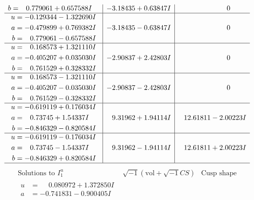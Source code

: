 \documentclass[1p]{elsarticle_modified}
\theoremstyle{definition}
\newcommand{\I}{\sqrt{-1}}
\begin{document}
$$\begin{array}{c|c|c}
\begin{aligned}
b &= \phantom{-}0.779061 + 0.657588 I\end{aligned}
 & -3.18435 + 0.63847 I & \phantom{-0.000000 } 0 \\ \hline\begin{aligned}
u &= -0.129344 - 1.322690 I \\
a &= -0.479899 + 0.769382 I \\
b &= \phantom{-}0.779061 - 0.657588 I\end{aligned}
 & -3.18435 - 0.63847 I & \phantom{-0.000000 } 0 \\ \hline\begin{aligned}
u &= \phantom{-}0.168573 + 1.321110 I \\
a &= -0.405207 + 0.035030 I \\
b &= \phantom{-}0.761529 + 0.328332 I\end{aligned}
 & -2.90837 + 2.42803 I & \phantom{-0.000000 } 0 \\ \hline\begin{aligned}
u &= \phantom{-}0.168573 - 1.321110 I \\
a &= -0.405207 - 0.035030 I \\
b &= \phantom{-}0.761529 - 0.328332 I\end{aligned}
 & -2.90837 - 2.42803 I & \phantom{-0.000000 } 0 \\ \hline\begin{aligned}
u &= -0.619119 + 0.176034 I \\
a &= \phantom{-}0.73745 + 1.54337 I \\
b &= -0.846329 - 0.820584 I\end{aligned}
 & \phantom{-}9.31962 + 1.94114 I & \phantom{-}12.61811 - 2.00223 I \\ \hline\begin{aligned}
u &= -0.619119 - 0.176034 I \\
a &= \phantom{-}0.73745 - 1.54337 I \\
b &= -0.846329 + 0.820584 I\end{aligned}
 & \phantom{-}9.31962 - 1.94114 I & \phantom{-}12.61811 + 2.00223 I\\
 \hline 
 \end{array}$$\newpage$$\begin{array}{c|c|c}  
\text{Solutions to }I^u_{1}& \I (\text{vol} + \sqrt{-1}CS) & \text{Cusp shape}\\
 \hline 
\begin{aligned}
u &= \phantom{-}0.080972 + 1.372850 I \\
a &= -0.741831 - 0.900405 I \\

\end{aligned}
\end{array}$$
\end{document}
